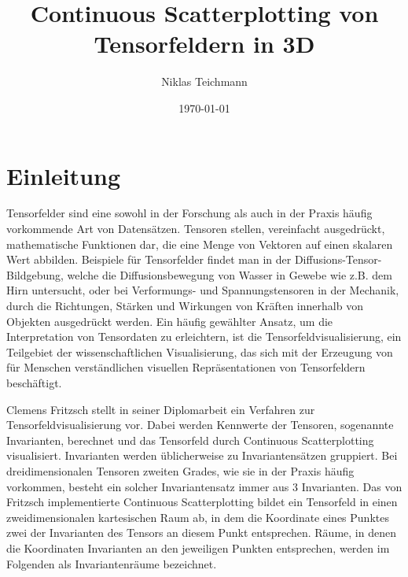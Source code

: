 \documentclass[a4paper,fontsize=12pt,toc=bib,parskip=half,ngerman]{scrartcl}
\title{Continuous Scatterplotting von Tensorfeldern in 3D\xspace}
\author{Niklas Teichmann}
\date{\today}
\begin{document}
\maketitle\clearpage
\pagestyle{empty}
\tableofcontents
\clearpage

\pagestyle{scrheadings}


\section{Einleitung}
Tensorfelder sind eine sowohl in der Forschung als auch in der Praxis h\"aufig vorkommende Art von Datens\"atzen. Tensoren stellen, vereinfacht ausgedr\"uckt, mathematische Funktionen dar, die eine Menge von Vektoren auf einen skalaren Wert abbilden. Beispiele f\"ur Tensorfelder findet man in der Diffusions-Tensor-Bildgebung\cite{basser1994mr}, welche die Diffusionsbewegung von Wasser in Gewebe wie z.B. dem Hirn untersucht, oder bei Verformungs-\cite[S.~122]{FundamentalsofStructuralMechanics} und Spannungstensoren\cite[S.~154]{FundamentalsofStructuralMechanics} in der Mechanik, durch die Richtungen, St\"arken und Wirkungen von Kr\"aften innerhalb von Objekten ausgedr\"uckt werden. Ein h\"aufig gew\"ahlter Ansatz, um die Interpretation von Tensordaten zu erleichtern, ist die Tensorfeldvisualisierung, ein Teilgebiet der wissenschaftlichen Visualisierung, das sich mit der Erzeugung von f\"ur Menschen verst\"andlichen visuellen Repr\"asentationen von Tensorfeldern besch\"aftigt.

Clemens Fritzsch stellt in seiner Diplomarbeit\cite{fritzsch2016continuousScatterplot} ein Verfahren zur Tensorfeldvisualisierung vor. Dabei werden Kennwerte der Tensoren, sogenannte Invarianten, berechnet und das Tensorfeld durch Continuous Scatterplotting\cite{bachthaler2008continuous} visualisiert. Invarianten werden \"ublicherweise zu Invariantens\"atzen gruppiert. Bei dreidimensionalen Tensoren zweiten Grades, wie sie in der Praxis h\"aufig vorkommen, besteht ein solcher Invariantensatz immer aus 3 Invarianten. Das von Fritzsch implementierte Continuous Scatterplotting bildet ein Tensorfeld in einen zweidimensionalen kartesischen Raum ab, in dem die Koordinate eines Punktes zwei der Invarianten des Tensors an diesem Punkt entsprechen. R\"aume, in denen die Koordinaten Invarianten an den jeweiligen Punkten entsprechen, werden im Folgenden als Invariantenr\"aume bezeichnet.
\end{document}

